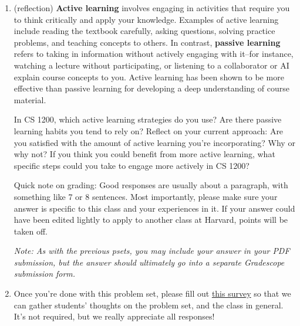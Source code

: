 \documentclass[11pt]{article}
\begin{document}
\begin{enumerate}
\begin{enumerate}
\end{enumerate}

\item (reflection) \textbf{Active learning} involves engaging in activities that require you to think critically and apply your knowledge. Examples of active learning include reading the textbook carefully, asking questions, solving practice problems, and teaching concepts to others. In contrast, \textbf{passive learning} refers to taking in information without actively engaging with it--for instance, watching a lecture without participating, or listening to a collaborator or AI explain course concepts to you. Active learning has been shown to be more effective than passive learning for developing a deep understanding of course material.


In CS 1200, which active learning strategies do you use? Are there passive learning habits you tend to rely on? Reflect on your current approach: Are you satisfied with the amount of active learning you're incorporating? Why or why not? If you think you could benefit from more active learning, what specific steps could you take to engage more actively in CS 1200?

Quick note on grading: Good responses are usually about a paragraph, with something like 7 or 8 sentences. Most importantly, please make sure your answer is specific to this class and your experiences in it. If your answer could have been edited lightly to apply to another class at Harvard, points will be taken off.

\textit{Note: As with the previous psets, you may include your answer in your PDF submission, but the answer should ultimately go into a separate Gradescope submission form.}

\item Once you're done with this problem set, please fill out \href{https://docs.google.com/forms/d/e/1FAIpQLSeBFY1KaYSC5wN2cyOdxwLYRVv0koA4S4ZA-Z4hmCWYO-HjPA/viewform?usp=publish-editor}{this survey} so that we can gather students' thoughts on the problem set, and the class in general. It's not required, but we really appreciate all responses!

\end{enumerate}
\end{document}

